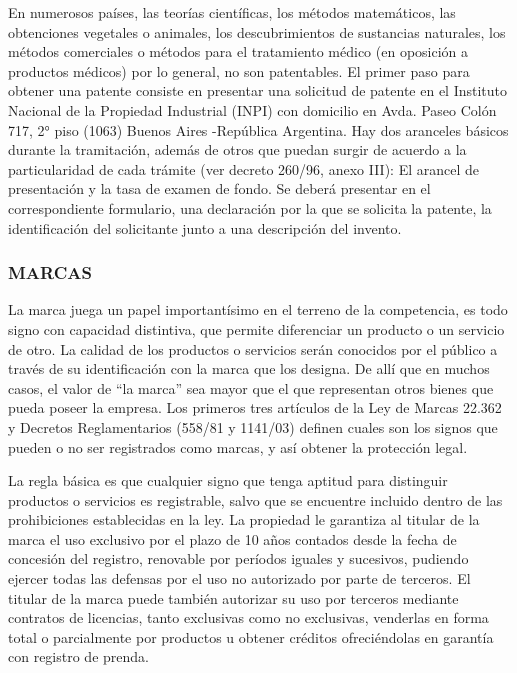 En numerosos países, las teorías científicas, los métodos matemáticos, las obtenciones vegetales o animales, los descubrimientos de sustancias naturales, los métodos comerciales o métodos para el tratamiento médico (en oposición a productos médicos) por lo general, no son patentables. El primer paso para obtener una patente consiste en presentar una solicitud de patente en el Instituto Nacional de la Propiedad Industrial (INPI) con domicilio en Avda. Paseo Colón 717, 2° piso (1063) Buenos Aires -República Argentina. Hay dos aranceles básicos durante la tramitación, además de otros que puedan surgir de acuerdo a la particularidad de cada trámite (ver decreto 260/96, anexo III): El arancel de presentación y la tasa de examen de fondo. Se deberá presentar en el correspondiente formulario, una declaración por la que se solicita la patente, la identificación del solicitante junto a una descripción del invento.

\subsubsection*{MARCAS}
La marca juega un papel importantísimo en el terreno de la competencia, es todo signo con capacidad distintiva, que permite diferenciar un producto o un servicio de otro. La calidad de los productos o servicios serán conocidos por el público a través de su identificación con la marca que los designa. De allí que en muchos casos, el valor de “la marca” sea mayor que el que representan otros bienes que pueda poseer la empresa. Los primeros tres artículos de la Ley de Marcas 22.362 y Decretos Reglamentarios (558/81 y 1141/03) definen cuales son los signos que pueden o no ser registrados como marcas, y así obtener la protección legal.



La regla básica es que cualquier signo que tenga aptitud para distinguir productos o servicios es registrable, salvo que se encuentre incluido dentro de las prohibiciones establecidas en la ley. La propiedad le garantiza al titular de la marca el uso exclusivo por el plazo de 10 años contados desde la fecha de concesión del registro, renovable por períodos iguales y sucesivos, pudiendo ejercer todas las defensas por el uso no autorizado por parte de terceros. El titular de la marca puede también autorizar su uso por terceros mediante contratos de licencias, tanto exclusivas como no exclusivas, venderlas en forma total o parcialmente por productos u obtener créditos ofreciéndolas en garantía con registro de prenda.

